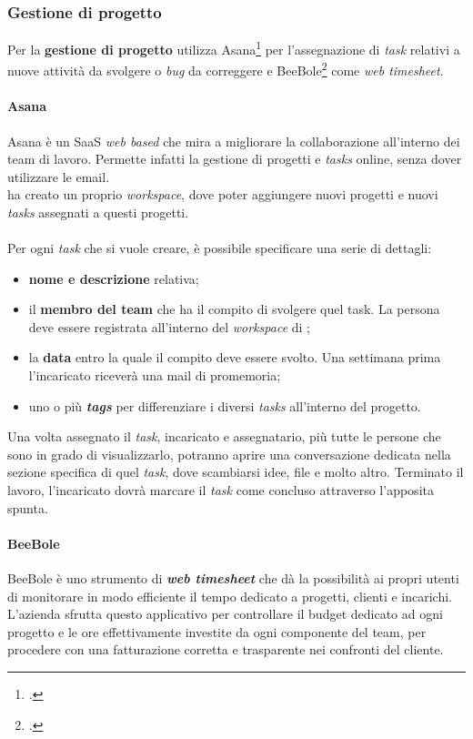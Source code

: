 \subsubsection{Gestione di progetto}
Per la \textbf{gestione di progetto} \azienda{} utilizza Asana\footcite{asana} per l'assegnazione di \emph{task} relativi a nuove attività da svolgere o \emph{bug} da correggere e BeeBole\footcite{beebole} come \emph{web timesheet}.
\paragraph{Asana}
Asana è un \gls{SaaS} \emph{web based} che mira a migliorare la collaborazione all'interno dei team di lavoro. Permette infatti la gestione di progetti e \emph{tasks} online, senza dover utilizzare le email.\\
\azienda{} ha creato un proprio \emph{workspace}, dove poter aggiungere nuovi progetti e nuovi \emph{tasks} assegnati a questi progetti. \\ \\
Per ogni \emph{task} che si vuole creare, è possibile specificare una serie di dettagli:
\begin{itemize}
	\item \textbf{nome e descrizione} relativa;
	\item il \textbf{membro del team} che ha il compito di svolgere quel task. La persona deve essere registrata all'interno del \emph{workspace} di \azienda;
	\item la \textbf{data} entro la quale il compito deve essere svolto. Una settimana prima l'incaricato riceverà una mail di promemoria;
	\item uno o più \textbf{\emph{tags}} per differenziare i diversi \emph{tasks} all'interno del progetto.
\end{itemize}
Una volta assegnato il \emph{task}, incaricato e assegnatario, più tutte le persone che sono in grado di visualizzarlo, potranno aprire una conversazione dedicata nella sezione specifica di quel \emph{task}, dove scambiarsi idee, file e molto altro. Terminato il lavoro, l'incaricato dovrà marcare il \emph{task} come concluso attraverso l'apposita spunta.

\paragraph{BeeBole}
BeeBole è uno strumento di \textbf{\emph{web timesheet}} che dà la possibilità ai propri utenti di monitorare in modo efficiente il tempo dedicato a progetti, clienti e incarichi. \\
L'azienda \azienda{} sfrutta questo applicativo per controllare il budget dedicato ad ogni progetto e le ore effettivamente investite da ogni componente del team, per procedere con una fatturazione corretta e trasparente nei confronti del cliente.
